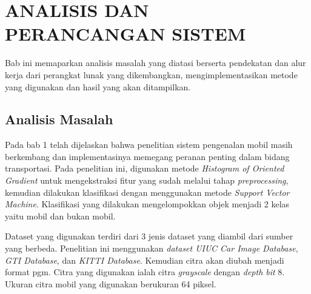 \chapter{ANALISIS DAN PERANCANGAN SISTEM}

%
\vspace{4.5pt}

Bab ini memaparkan analisis masalah yang diatasi berserta pendekatan dan alur kerja dari perangkat lunak yang dikembangkan, mengimplementasikan metode yang digunakan dan hasil yang akan ditampilkan.
\\
\section{Analisis Masalah}
Pada bab 1 telah dijelaskan bahwa penelitian sistem pengenalan mobil masih berkembang dan implementasinya memegang peranan penting dalam bidang transportasi. Pada penelitian ini, digunakan metode \textit{Histogram of Oriented Gradient} untuk mengekstraksi fitur yang sudah melalui tahap \textit{preprocessing}, kemudian dilakukan klasifikasi dengan menggunakan metode \textit{Support Vector Machine}. Klasifikasi yang dilakukan mengelompokkan objek menjadi 2 kelas yaitu mobil dan bukan mobil.


Dataset yang digunakan terdiri dari 3 jenis dataset yang diambil dari sumber yang berbeda. Penelitian ini menggunakan \textit{dataset UIUC Car Image Database}, \textit{GTI Database}, dan \textit{KITTI Database}. Kemudian citra akan diubah menjadi format pgm. Citra yang digunakan  ialah citra \textit{grayscale} dengan \textit{depth bit} 8. Ukuran citra mobil yang digunakan berukuran 64  piksel.

